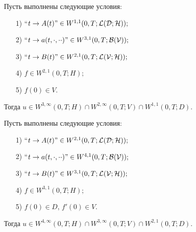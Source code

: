\begin{thm}


Пусть выполнены следующие условия\/$:$


\begin{itemize}


\item[1)] ``$t\to A(t)\text{''}\in W^{1,1}(0,T;\cal L(D;H));$


\item[2)] ``$t\to a(t,\cdot,\cdot\cdot)\text{''}\in W^{3,1}(0,T;\cal B(V));$


\item[3)] ``$t\to B(t)\text{''}\in W^{2,1}(0,T;\cal L(V;H));$


\item[4)] $f\in W^{2,1}(0,T;H);$


\item[5)] $f(0)\in V$.


\end{itemize}


Тогда $u\in W^{3,\infty}(0,T;H)\cap W^{2,\infty}(0,T;V)\cap W^{1,1}(0,T;D)$.


\end{thm}





\begin{thm}


Пусть выполнены следующие условия\/$:$


\begin{itemize}


\item[1)] ``$t\to A(t)\text{''} \in W^{2,1}(0,T;\cal L(D;H));$


\item[2)] ``$t\to a(t,\cdot,\cdot\cdot)\text{''}\in W^{4,1}(0,T;\cal B(V));$


\item[3)] ``$t\to B(t)\text{''}\in W^{3,1}(0,T;\cal L(V;H));$


\item[4)] $f\in W^{3,1}(0,T;H);$


\item[5)] $f(0)\in D$, $f'(0)\in V$.


\end{itemize}


Тогда $u\in W^{4,\infty}(0,T;H)\cap W^{3,\infty}(0,T;V)\cap W^{2,1}(0,T;D)$.


\end{thm}





